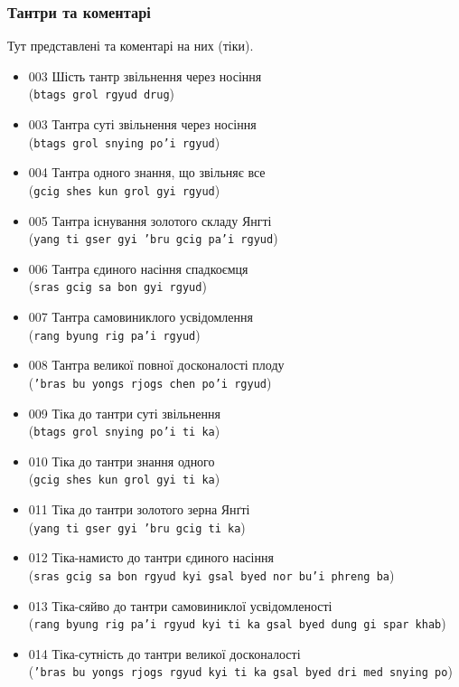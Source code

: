 \documentclass{article}
\begin{document}
\subsubsection{Тантри та коментарі}

Тут представлені та коментарі на них (тіки).

\begingroup\raggedright
\begin{itemize}
\item 003 Шість тантр звільнення через носіння \\ (\texttt{btags grol rgyud drug})
\item 003 Тантра суті звільнення через носіння \\ (\texttt{btags grol snying po'i rgyud})
\item 004 Тантра одного знання, що звільняє все \\ (\texttt{gcig shes kun grol gyi rgyud})
\item 005 Тантра існування золотого складу Янгті \\ (\texttt{yang ti gser gyi 'bru gcig pa'i rgyud})
\item 006 Тантра єдиного насіння спадкоємця \\ (\texttt{sras gcig sa bon gyi rgyud})
\item 007 Тантра самовиниклого усвідомлення \\  (\texttt{rang byung rig pa'i rgyud})
\item 008 Тантра великої повної досконалості плоду \\ (\texttt{'bras bu yongs rjogs chen po'i rgyud})
\item 009 Тіка до тантри суті звільнення \\ (\texttt{btags grol snying po'i ti ka})
\item 010 Тіка до тантри знання одного \\ (\texttt{gcig shes kun grol gyi ti ka})
\item 011 Тіка до тантри золотого зерна Янґті \\ (\texttt{yang ti gser gyi 'bru gcig ti ka})
\item 012 Тіка-намисто до тантри єдиного насіння \\ (\texttt{sras gcig sa bon rgyud kyi gsal byed nor bu'i phreng ba})
\item 013 Тіка-сяйво до тантри самовиниклої усвідомленості \\ (\texttt{rang byung rig pa'i rgyud kyi ti ka gsal byed dung gi spar khab})
\item 014 Тіка-сутність до тантри великої досконалості \\ (\texttt{'bras bu yongs rjogs rgyud kyi ti ka gsal byed dri med snying po})

\end{itemize}
\end{document}
